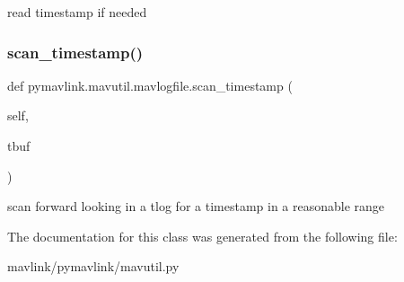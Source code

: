 \begin{DoxyVerb}read timestamp if needed\end{DoxyVerb}
 \mbox{\label{classpymavlink_1_1mavutil_1_1mavlogfile_a53edd3e229ee05b6e9d3401d0d940bfc}} 
\subsubsection{\texorpdfstring{scan\+\_\+timestamp()}{scan\_timestamp()}}
{\footnotesize\ttfamily def pymavlink.\+mavutil.\+mavlogfile.\+scan\+\_\+timestamp (\begin{DoxyParamCaption}\item[{}]{self,  }\item[{}]{tbuf }\end{DoxyParamCaption})}

\begin{DoxyVerb}scan forward looking in a tlog for a timestamp in a reasonable range\end{DoxyVerb}
 

The documentation for this class was generated from the following file\+:\begin{DoxyCompactItemize}
\item 
mavlink/pymavlink/mavutil.\+py\end{DoxyCompactItemize}
